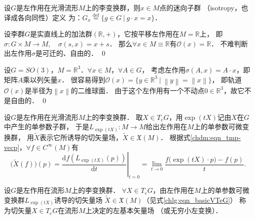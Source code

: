 
\begin{definition}\label{chlg:def_isotropy}
    设$G$是左作用在光滑流形$M$上的李变换群，则$x \in M$点的{\heiti 迷向子群}
    （isotropy，也译成{\kaishu 各向同性}）定义
    为：$G_x \overset{\mathrm {def}}{=} \{ g\in G \ | \  g\cdot x = x \}$．
\end{definition}

\begin{example}
    设李群$G$是实直线上的加法群$(\mathbb{R},+)$，它按平移左作用在$M=\mathbb{R}$上，
    即$\sigma: G\times M \to M,\quad \sigma(s,x)=x+s$．
    那么$\forall x\in M\equiv \mathbb{R}$有$\mathcal{O}(x)=\mathbb{R}$．
    不难判断出左作用$\sigma$是可迁的、自由的． \qed
\end{example}

\begin{example}
    设$G=SO(3)$，$M=\mathbb{R}^3$．$\forall x\in M$，$\forall A\in G$，
    考虑左作用$\sigma(A,x)=A\cdot x$，即矩阵$A$乘以列矢量$x$．
    很容易得到$\mathcal{O}(x)=\{y\in \mathbb{R}^3 \ |\   \left\|y\right\|=\left\|x\right\| \}$，
    即轨道$\mathcal{O}(x)$是半径为$\left\|x\right\|$的二维球面．
    由于这个左作用有一个不动点$0\in \mathbb{R}^3$，故它不是自由的． \qed
\end{example}



设$G$是左作用在光滑流形$M$上的李变换群．
取$X \in T_e G$，用$\exp(tX)$记由$X$在$G$中产生的单参数子群，
于是$L_{\exp(tX)}: M \rightarrow M$给出左作用在$M$上的单参数可微变换群，
用$\widetilde{X}$表示它所诱导的切矢量场，$\widetilde{X} \in \mathfrak{X}(M)$．
根据式\eqref{chdm:eqn_tmp-vecp}，$\forall f \in C^{\infty}(M)$有
\begin{equation}\label{chlg:eqn_basicVTeG}
    \bigl(\widetilde{X}(f)\bigr)(p) = \left.\frac{\mathrm{d} f\left(L_{\exp(tX)}(p)\right)}{\mathrm{d} t}\right|_{t=0} 
    =\lim _{t \rightarrow 0} \frac{f\bigl(\exp(tX)\cdot p\bigr)-f(p)}{t} .
\end{equation}


\begin{definition}\label{chlg:def_left-basicV}
    设$G$是左作用在流形$M$上的李变换群．
    $\forall X \in T_e G$，由左作用在$M$上的单参数可微变换群$L_{\exp (t  X)}$诱导的切矢量场
    $\widetilde{X} \in \mathfrak{X}(M)$（见式\eqref{chlg:eqn_basicVTeG}）
    称为切矢量$X \in T_e G$在流形$M$上决定的{\heiti 左基本矢量场}
    （或{\heiti 无穷小左变换}）．
\end{definition} 


